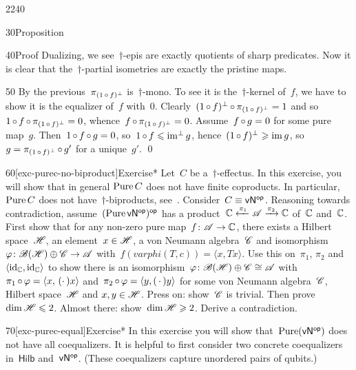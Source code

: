 \begin{parsec}{2240}
\begin{point}{30}{Proposition}
\begin{point}{40}{Proof}
Dualizing, we see~$\dagger$-epis are exactly quotients of sharp predicates.
Now it is clear that the~$\dagger$-partial isometries
are exactly the pristine maps.
\begin{point}{50}%
By the previous~$\pi_{(1 \mathop{\circ} f)^\perp}$ is~$\dagger$-mono.
To see it is the~$\dagger$-kernel of~$f$,
we have to show it is the equalizer of~$f$ with~$0$.
Clearly~$(1 \mathop{\circ} f )^\perp \mathop{\circ} \pi_{(1 \mathop{\circ} f)^\perp} = 1$
and so~$1 \mathop{\circ} f \mathop{\circ} \pi_{(1 \mathop{\circ} f)^\perp} = 0$,
whence~$f \mathop{\circ} \pi_{(1 \mathop{\circ} f)^\perp} = 0$.
Assume~$f \mathop{\circ} g = 0$ for some pure map~$g$.
Then~$1 \mathop{\circ} f \mathop{\circ} g = 0$,
    so~$1 \mathop{\circ} f \leqslant \operatorname{im^\perp} g$,
    hence~$(1 \mathop{\circ} f)^\perp \geqslant \operatorname{im} g$,
    so~$g = \pi_{(1 \mathop{\circ} f)^\perp} \mathop{\circ} g'$
    for a unique~$g'$. \qed
\end{point}
\end{point}
\end{point}
\begin{point}{60}[exc-purec-no-biproduct]{Exercise*}%
Let~$C$ be a~$\dagger$-effectus.
In this exercise, you will show that
    in general $\operatorname{Pure} C$
    does not have finite coproducts.
In particular, $\operatorname{Pure} C$ does not have~$\dagger$-biproducts,
    see~\cite[3.2.15]{heunenphd}.
Consider~$C \equiv {\mathsf{vN}}{^{\mathsf{op}}}$.
Reasoning towards contradiction,
    assume~$(\operatorname{Pure} {\mathsf{vN}}{^{\mathsf{op}}})^{\mathsf{op}}$
    has a product~$ \mathbb{C} \xleftarrow{\pi_1} \mathscr{A} \xrightarrow{\pi_2} \mathbb{C}$
    of~$\mathbb{C} $ and~$\mathbb{C}$.
First show that for any non-zero pure map~$f\colon \mathscr{A} \to \mathbb{C}$,
    there exists a Hilbert space~$\mathscr{H}$, an element~$x \in \mathscr{H}$,
    a von Neumann algebra~$\mathscr{C}$ and
    isomorphism~$\varphi\colon \mathscr{B}(\mathscr{H})\oplus \mathscr{C} \to \mathscr{A}$
    with~$f (varphi(T,c)) = \langle x, T x\rangle $.
Use this on~$\pi_1$, $\pi_2$ and~$\langle\mathrm{id}_{\mathbb{C}},\mathrm{id}_{\mathbb{C}}\rangle $
    to show there is an
    isomorphism~$\varphi\colon  \mathscr{B}(\mathscr{H}) \oplus \mathscr{C} \cong \mathscr{A}$
    with~$\pi_1 \mathop{\circ} \varphi = \left<x,\,(\cdot\,)x\right>$
    and~$\pi_2 \mathop{\circ} \varphi = \left<y,(\,\cdot\,)y\right>$
    for some von Neumann algebra~$\mathscr{C}$,
    Hilbert space~$\mathscr{H}$ and $x,y \in \mathscr{H}$.
Press on: show~$\mathscr{C}$ is trivial.
    Then prove~$\dim \mathscr{H} \leqslant 2$.
    Almost there: show~$\dim \mathscr{H} \geqslant 2$.
    Derive a contradiction.
\end{point}
\begin{point}{70}[exc-purec-equal]{Exercise*}%
In this exercise you will show that~$\operatorname{Pure}({\mathsf{vN}}{^{\mathsf{op}}})$ does not have
    all coequalizers.  It is helpful to first consider
    two concrete coequalizers in~$\mathsf{Hilb}$ and~${\mathsf{vN}}{^{\mathsf{op}}}$.
(These coequalizers capture unordered pairs of qubits.)


\end{point}
\end{parsec}

